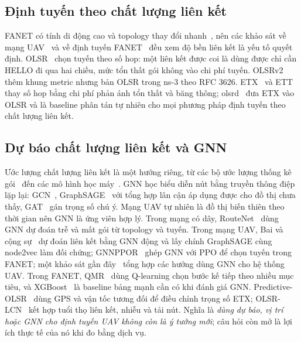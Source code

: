 \subsection{Định tuyến theo chất lượng liên kết}
FANET có tính di động cao và topology thay đổi nhanh~\cite{bekmezci}, nên các
khảo sát về mạng UAV~\cite{gupta,hayat} và về định tuyến
FANET~\cite{arafat,lakew} đều xem độ bền liên kết là yếu tố quyết định.
OLSR~\cite{rfc3626} chọn tuyến theo số hop: một liên kết được coi là dùng được
chỉ cần HELLO đi qua hai chiều, mức tổn thất gói không vào chi phí tuyến.
OLSRv2~\cite{rfc7181} thêm khung metric nhưng bản OLSR trong ns-3 theo RFC 3626.
ETX~\cite{decouto} và ETT~\cite{draves} thay số hop bằng chi phí phản ánh tổn
thất và băng thông; olsrd~\cite{olsrd} đưa ETX vào OLSR và là baseline phân tán
tự nhiên cho mọi phương pháp định tuyến theo chất lượng liên kết.

\subsection{Dự báo chất lượng liên kết và GNN}
Ước lượng chất lượng liên kết là một hướng riêng, từ các bộ ước lượng thống kê
gói~\cite{baccour} đến các mô hình học máy~\cite{cerar}. GNN học biểu diễn nút
bằng truyền thông điệp lặp lại: GCN~\cite{kipf}, GraphSAGE~\cite{graphsage} với
tổng hợp lân cận áp dụng được cho đồ thị chưa thấy, GAT~\cite{gat} gán trọng số
chú ý. Mạng UAV tự nhiên là đồ thị biến thiên theo thời gian nên GNN là ứng viên
hợp lý. Trong mạng có dây, RouteNet~\cite{routenet} dùng GNN dự đoán trễ và mất
gói từ topology và tuyến. Trong mạng UAV, Bai và cộng sự~\cite{bai2025} dự đoán
liên kết bằng GNN động và lấy chính GraphSAGE cùng node2vec làm đối chứng;
GNNPPOR~\cite{gnnppor} ghép GNN với PPO để chọn tuyến trong FANET; một khảo sát
gần đây~\cite{drones2026} tổng hợp các hướng dùng GNN cho hệ thống UAV. Trong
FANET, QMR~\cite{qmr} dùng Q-learning chọn bước kế tiếp theo nhiều mục tiêu, và
XGBoost~\cite{xgboost} là baseline bảng mạnh cần có khi đánh giá GNN.
Predictive-OLSR~\cite{rosati2013} dùng GPS và vận tốc tương đối để điều chỉnh
trọng số ETX; OLSR-LCN~\cite{liu2025} kết hợp tuổi thọ liên kết, nhiễu và tải
nút. Nghĩa là \emph{dùng dự báo, vị trí hoặc GNN cho định tuyến UAV không còn
là ý tưởng mới}; câu hỏi còn mở là lợi ích thực tế của nó khi đo bằng dịch vụ.

